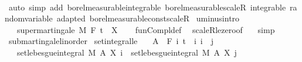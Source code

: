 \begin{isabellebody}
\ \ \isacommand{{\isacharbraceright}{\kern0pt}}\isamarkupfalse%
\isanewline
{}\isamarkupfalse%
\ {\isacharparenleft}{\kern0pt}auto\ simp\ add{\isacharcolon}{\kern0pt}\ borel{\isacharunderscore}{\kern0pt}measurable{\isacharunderscore}{\kern0pt}integrable\ borel{\isacharunderscore}{\kern0pt}measurable{\isacharunderscore}{\kern0pt}scaleR\ integrable\ random{\isacharunderscore}{\kern0pt}variable\ adapted\ borel{\isacharunderscore}{\kern0pt}measurable{\isacharunderscore}{\kern0pt}const{\isacharunderscore}{\kern0pt}scaleR{\isacharparenright}{\kern0pt}%
\endisatagproof
{\isafoldproof}%
%
\isadelimproof
\isanewline
%
\endisadelimproof
\isanewline
{}\isamarkupfalse%
\ uminus{\isacharbrackleft}{\kern0pt}intro{\isacharbrackright}{\kern0pt}{\isacharcolon}{\kern0pt}\isanewline
\ \ \ {\isachardoublequoteopen}supermartingale\ M\ F\ t\ {\isacharparenleft}{\kern0pt}{\isacharminus}{\kern0pt}\ X{\isacharparenright}{\kern0pt}{\isachardoublequoteclose}\isanewline
%
\isadelimproof
\ \ %
\endisadelimproof
%
\isatagproof
{}\isamarkupfalse%
\ fun{\isacharunderscore}{\kern0pt}Compl{\isacharunderscore}{\kern0pt}def\ \isamarkupfalse%
\ scaleR{\isacharunderscore}{\kern0pt}le{\isacharunderscore}{\kern0pt}zero{\isacharbrackleft}{\kern0pt}of\ {\isachardoublequoteopen}{\isacharminus}{\kern0pt}{}{\isachardoublequoteclose}{\isacharbrackright}{\kern0pt}\ \isamarkupfalse%
\ simp%
\endisatagproof
{\isafoldproof}%
%
\isadelimproof
\isanewline
%
\endisadelimproof
\isanewline
{}\isamarkupfalse%
\isanewline
\isanewline
{}\isamarkupfalse%
\ submartingale{\isacharunderscore}{\kern0pt}linorder\isanewline
{}\isanewline
\isanewline
{}\isamarkupfalse%
\ set{\isacharunderscore}{\kern0pt}integral{\isacharunderscore}{\kern0pt}le{\isacharcolon}{\kern0pt}\isanewline
\ \ \ {\isachardoublequoteopen}A\ {\isasymin}\ F\ i{\isachardoublequoteclose}\ {\isachardoublequoteopen}t\ {\isasymle}\ i{\isachardoublequoteclose}\ {\isachardoublequoteopen}i\ {\isasymle}\ j{\isachardoublequoteclose}\isanewline
\ \ \ {\isachardoublequoteopen}set{\isacharunderscore}{\kern0pt}lebesgue{\isacharunderscore}{\kern0pt}integral\ M\ A\ {\isacharparenleft}{\kern0pt}X\ i{\isacharparenright}{\kern0pt}\ {\isasymle}\ set{\isacharunderscore}{\kern0pt}lebesgue{\isacharunderscore}{\kern0pt}integral\ M\ A\ {\isacharparenleft}{\kern0pt}X\ j{\isacharparenright}{\kern0pt}{\isachardoublequoteclose}\ \ \isanewline

\end{isabellebody}
